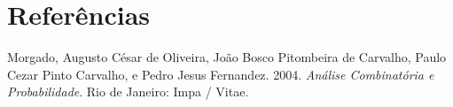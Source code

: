 \documentclass[
  11pt]{report}
\newlength{\cslhangindent}
\newlength{\cslentryspacingunit} %
\newenvironment{CSLReferences}[2] %
 {%
  \setlength{\parindent}{0pt}
  \ifodd #1
  \let\oldpar\par
  \def\par{\hangindent=\cslhangindent\oldpar}
  \fi
  \setlength{\parskip}{#2\cslentryspacingunit}
 }%
 {}
\begin{document}
\hypertarget{referuxeancias}{%
\chapter*{Referências}\label{referuxeancias}}

\hypertarget{refs}{}
\begin{CSLReferences}{1}{0}
\leavevmode{}%
Morgado, Augusto César de Oliveira, João Bosco Pitombeira de Carvalho, Paulo Cezar Pinto Carvalho, e Pedro Jesus Fernandez. 2004. \emph{Análise Combinatória e Probabilidade}. {Rio de Janeiro}: {Impa / Vitae}.

\end{CSLReferences}
\end{document}
